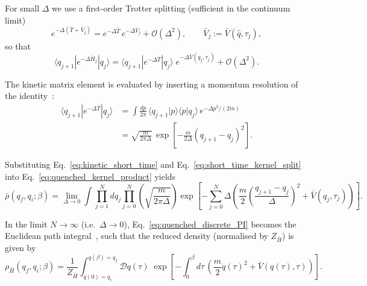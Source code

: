 \documentclass[aps,prl,twocolumn,superscriptaddress,showpacs,floatfix]{revtex4-2}
\begin{document}
For small $\Delta$ we use a first-order Trotter splitting (sufficient in the continuum
limit)~\cite{kleinertPathIntegralsQuantum2009}
\begin{equation}
    e^{-\Delta(\bar T+\bar V_j)}
    =
    e^{-\Delta \bar T}\,e^{-\Delta \bar V_j}
    +\mathcal O(\Delta^2),
    \qquad
    \bar V_j:=\bar V(\hat q,\tau_j),
    \label{eq:trotter_split}
\end{equation}
so that
\begin{equation}
    \langle q_{j+1}|e^{-\Delta \bar H_j}|q_j\rangle
    =
    \langle q_{j+1}|e^{-\Delta \bar T}|q_j\rangle\;
    e^{-\Delta \bar V(q_j,\tau_j)}
    +\mathcal O(\Delta^2).
    \label{eq:short_time_kernel_split}
\end{equation}

The kinetic matrix element is evaluated by inserting a momentum resolution of
the identity~\cite{feynmanQuantumMechanicsPath1965,schulmanTechniquesApplicationsPath1981}:
\begin{align}
    \langle q_{j+1}|e^{-\Delta \bar T}|q_j\rangle
    &=
    \int \frac{dp}{2\pi}\,
    \langle q_{j+1}|p\rangle\langle p|q_j\rangle\,e^{-\Delta p^2/(2m)}
    \nonumber\\
    &=
    \sqrt{\frac{m}{2\pi\Delta}}\,
    \exp\!\left[-\frac{m}{2\Delta}(q_{j+1}-q_j)^2\right].
    \label{eq:kinetic_short_time}
\end{align}
\begin{widetext}
Substituting Eq.~\eqref{eq:kinetic_short_time} and Eq.~\eqref{eq:short_time_kernel_split} into
Eq.~\eqref{eq:quenched_kernel_product} yields
\begin{equation}
    \bar\rho(q_f,q_i;\beta)
    =
    \lim_{\Delta\to 0}
    \int \prod_{j=1}^{N} dq_j
    \prod_{j=0}^{N}
    \left(\sqrt{\frac{m}{2\pi\Delta}}\right)
    \exp\!\left[
        -\sum_{j=0}^{N}
        \Delta\left(
            \frac{m}{2}\left(\frac{q_{j+1}-q_j}{\Delta}\right)^2
            +\bar V(q_j,\tau_j)
        \right)
    \right].
    \label{eq:quenched_discrete_PI}
\end{equation}

In the limit $N\to\infty$ (i.e.\ $\Delta\to 0$), Eq.~\eqref{eq:quenched_discrete_PI} becomes the
Euclidean path integral~\cite{feynmanQuantumMechanicsPath1965,kleinertPathIntegralsQuantum2009,groscheHandbookFeynmanPath1998}, such that the reduced density (normalised by $Z_{\bar H}$) is given by
\begin{equation}
    \rho_{\bar H}(q_f,q_i;\beta)
    =
    \frac{1}{Z_{\bar H}}
    \int_{q(0)=q_i}^{q(\beta)=q_f}\!\!\mathcal D q(\tau)\;
    \exp\!\left[
        -\int_0^\beta d\tau\,
        \left(
            \frac{m}{2}\dot q(\tau)^2+\bar V(q(\tau),\tau)
        \right)
    \right].
    \label{eq:quenched_continuum_PI}
\end{equation}
\end{widetext}
\end{document}
